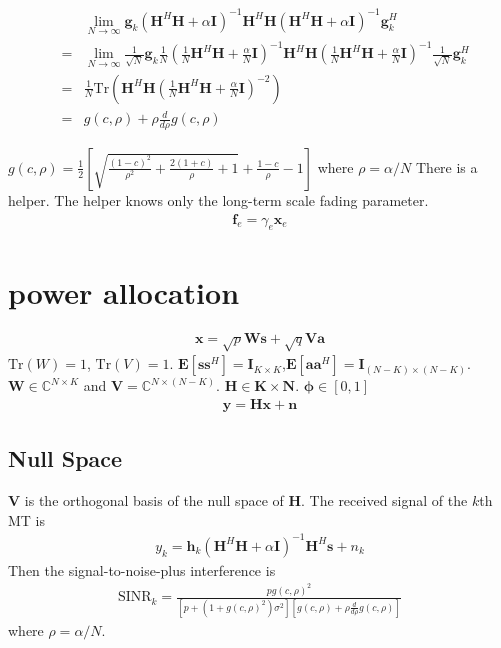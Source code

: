 \documentclass[12pt,journal,draftclsnofoot,onecolumn]{IEEEtran}
\begin{document}
\begin{eqnarray}
&&\lim_{N \to \infty}\mathbf{g}_k\left(\mathbf{H}^H\mathbf{H} + \alpha\mathbf{I}\right)^{-1}\mathbf{H}^H\mathbf{H}\left(\mathbf{H}^H\mathbf{H} + \alpha\mathbf{I}\right)^{-1}\mathbf{g}_k^H\\
&=&\lim_{N \to \infty}\frac{1}{\sqrt{N}}\mathbf{g}_k\frac{1}{N}\left(\frac{1}{N}\mathbf{H}^H\mathbf{H} + \frac{\alpha}{N}\mathbf{I}\right)^{-1}\mathbf{H}^H\mathbf{H}\left(\frac{1}{N}\mathbf{H}^H\mathbf{H} + \frac{\alpha}{N} \mathbf{I}\right)^{-1}\frac{1}{\sqrt{N}}\mathbf{g}_k^H\\
&=& \frac{1}{N}\mathrm{Tr}\left(\mathbf{H}^H\mathbf{H}\left(\frac{1}{N}\mathbf{H}^H\mathbf{H} + \frac{\alpha}{N} \mathbf{I}\right)^{-2}\right) \\ 
&=&g(c,\rho) + \rho\frac{d}{d\rho}g(c,\rho)
\end{eqnarray}

$g(c,\rho)= \frac{1}{2}\left[\sqrt{\frac{(1-c)^2}{\rho^2}+ \frac{2(1+c)}{\rho} + 1}+\frac{1-c}{\rho} - 1\right]$ 
where $\rho = \alpha/N$
There is a helper. The helper knows only the long-term scale fading parameter. 
\begin{eqnarray}
\mathbf{f}_e = \gamma_e\mathbf{x}_e
\end{eqnarray}

\section{power allocation}
\begin{eqnarray}
\mathbf{x} = \sqrt{p}\mathbf{W}\mathbf{s} + \sqrt{q}\mathbf{V}\mathbf{a}
\end{eqnarray}
$\mathrm{Tr}(W) = 1$, $\mathrm{Tr}(V) = 1$. $\mathbf{E}[\mathbf{s}\mathbf{s}^H] = \mathbf{I}_{K \times K}$,$\mathbf{E}[\mathbf{a}\mathbf{a}^H] = \mathbf{I}_{(N-K)\times (N-K)}$. $\mathbf{W} \in \mathbb{C}^{N \times K}$ and $\mathbf{V} = \mathbb{C}^{N \times (N - K)}$. $\mathbf{H} \in \mathbf{K \times N}$. $\mathbf{\phi} \in [0,1]$
\begin{eqnarray}
\mathbf{y} = \mathbf{H}\mathbf{x} + \mathbf{n}
\end{eqnarray}

\subsection{Null Space}
$\mathbf{V}$ is the orthogonal basis of the null space of $\mathbf{H}$. The received signal of the $k$th MT is
\begin{eqnarray}
y_k = \mathbf{h}_k\left(\mathbf{H}^H\mathbf{H} + \alpha \mathbf{I}\right)^{-1}\mathbf{H}^H\mathbf{s} + n_k
\end{eqnarray}
Then the signal-to-noise-plus interference is
\begin{eqnarray}
\mathrm{SINR}_k = \frac{pg(c,\rho)^2}{\left[p + (1 + g(c,\rho)^2)\sigma^2\right]\left[g(c,\rho) + \rho\frac{d}{d\rho}g(c,\rho)\right]}
\end{eqnarray}
where $\rho = \alpha/N$.
\end{document}
